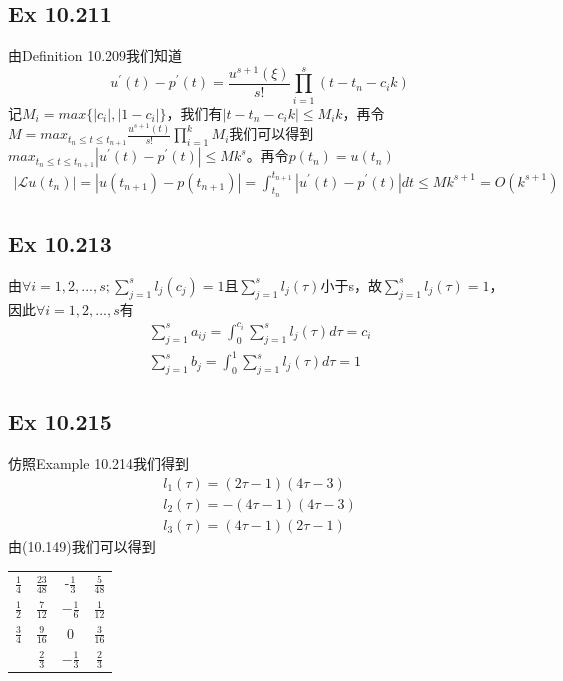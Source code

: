 \documentclass{article}
\begin{document}
\subsection*{Ex 10.211}
\indent 由Definition 10.209我们知道
$$
u^{'}(t)-p^{'}(t)=\frac{u^{s+1}(\xi)}{s!}\prod_{i=1}^s(t-t_n-c_ik)
$$
记$M_i=max\{|c_i|,|1-c_i|\}$，我们有$|t-t_n-c_ik|\le M_ik$，再令$M=max_{t_n\le t\le t_{n+1}}\frac{u^{s+1}(t)}{s!}\prod_{i=1}^kM_i$我们可以得到$max_{t_n\le t\le t_{n+1}}|u^{'}(t)-p^{'}(t)|\le Mk^s$。再令$p(t_n)=u(t_n)$
\begin{equation*}
\begin{aligned}
|\mathcal{L}u(t_n)|=|u(t_{n+1})-p(t_{n+1})|=\int_{t_n}^{t_{n+1}}|u^{'}(t)-p^{'}(t)|dt\le Mk^{s+1}=O(k^{s+1})
\end{aligned}
\end{equation*}

\subsection*{Ex 10.213}
\indent 由$\forall i=1,2,...,s; \sum_{j=1}^sl_j(c_j)=1$且$\sum_{j=1}^sl_j(\tau)$小于s，故$\sum_{j=1}^sl_j(\tau)=1$，因此$\forall i=1,2,...,s$有
\begin{equation*}
\begin{aligned}
\sum_{j=1}^sa_{ij}=\int_0^{c_i}\sum_{j=1}^sl_j(\tau)d\tau=c_i\\
\sum_{j=1}^sb_j=\int_0^1\sum_{j=1}^sl_j(\tau)d\tau = 1
\end{aligned}
\end{equation*}

\subsection*{Ex 10.215}
\indent 仿照Example 10.214我们得到
\begin{equation*}
\begin{aligned}
l_1(\tau)=(2\tau-1)(4\tau-3)\\
l_2(\tau)=-(4\tau-1)(4\tau-3)\\
l_3(\tau)=(4\tau-1)(2\tau-1)
\end{aligned}
\end{equation*}
由(10.149)我们可以得到
\begin{center}
\begin{tabular}{c|c c c}
    $\frac{1}{4}$ & $\frac{23}{48}$ & -$\frac{1}{3}$ & $\frac{5}{48}$\\
    $\frac{1}{2}$ & $\frac{7}{12}$ & $-\frac{1}{6}$ & $\frac{1}{12}$ \\
    $\frac{3}{4}$ & $\frac{9}{16}$ & 0 & $\frac{3}{16}$ \\
    \hline
    & $\frac{2}{3}$ & $-\frac{1}{3}$ & $\frac{2}{3}$
\end{tabular}
\end{center}
\end{document}
